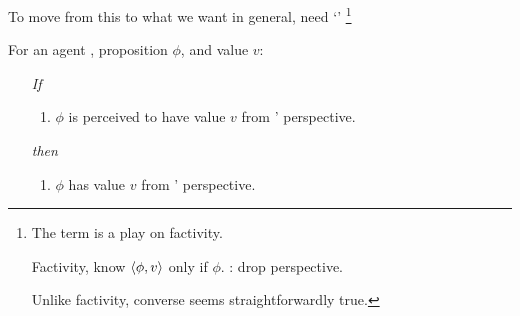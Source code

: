 \begin{note}
  To move from this to what we want in general, need `\emph{}'%
  \footnote{
    The term is a play on factivity.

    Factivity, know \(\langle \phi, v \rangle\) only if \(\phi\).
    : drop perspective.

    Unlike factivity, converse seems straightforwardly true.
  }

  \begin{principle}[\ptivity{2}]
    \label{def:perspectivity}
    For an agent \vAgent{}, proposition \(\phi\), and value \(v\):
    \begin{enumerate}[noitemsep]
    \item[\emph{If}]
      \begin{enumerate}[label=\alph*., ref=(\alph*)]
      \item
        \(\phi\) is perceived to have value \(v\) from \vAgent{}' perspective.
      \end{enumerate}
    \item[\emph{then}]
      \begin{enumerate}[label=\alph*., ref=(\alph*), resume]
      \item
        \(\phi\) has value \(v\) from \vAgent{}' perspective.
      \end{enumerate}
    \end{enumerate}
    \vspace{-\baselineskip}
  \end{principle}
\end{note}

